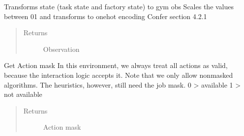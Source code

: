 \documentclass[letterpaper,10pt,english]{sphinxmanual}
\begin{document}
\begin{fulllineitems}
\begin{fulllineitems}
\label{\detokenize{environments:environments.env_tetris_scheduling_indirect_action.IndirectActionEnv.state_obs}}
\sphinxAtStartPar
Transforms state (task state and factory state) to gym obs
Scales the values between 0\sphinxhyphen{}1 and transforms to onehot encoding
Confer  section 4.2.1
\begin{quote}\begin{description}
\item[{Returns}] \leavevmode
\sphinxAtStartPar
Observation

\end{description}\end{quote}

\end{fulllineitems}


\begin{fulllineitems}
\label{\detokenize{environments:environments.env_tetris_scheduling_indirect_action.IndirectActionEnv.get_action_mask}}
\sphinxAtStartPar
Get Action mask
In this environment, we always treat all actions as valid, because the interaction logic accepts it. Note that
we only allow non\sphinxhyphen{}masked algorithms.
The heuristics, however, still need the job mask.
0 \sphinxhyphen{}\textgreater{} available
1 \sphinxhyphen{}\textgreater{} not available
\begin{quote}\begin{description}
\item[{Returns}] \leavevmode
\sphinxAtStartPar
Action mask

\end{description}\end{quote}

\end{fulllineitems}



\end{fulllineitems}
\end{document}
